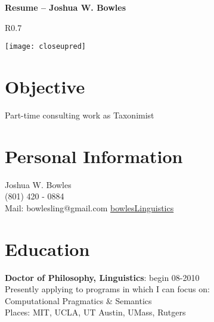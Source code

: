 \documentclass[margin,line,a4paper]{resume}
\begin{document}
{\sc \Large {\bf Resume -- Joshua W. Bowles}}
\begin{resume}
    \vspace{0.5cm}
    \begin{wrapfigure}{R}{0.7\textwidth}
         \vspace{-1cm}
        \begin{center}
        \texttt{[image: closeupred]}
        \end{center}
         \vspace{-1cm}
    \end{wrapfigure}
\section{Objective}
Part-time consulting work as Taxonimist

\section{Personal Information}
Joshua W. Bowles\\
(801) 420 - 0884\\
Mail: bowlesling@gmail.com
\href{http://sites.google.com/site/bowleslinguistics/}{bowlesLinguistics}\\ 
  

\section{Education}
{\bf Doctor of Philosophy, Linguistics}: begin 08-2010\\ 
Presently applying to programs in which I can focus on:\\ Computational Pragmatics \& Semantics\\ Places: MIT, UCLA, UT Austin, UMass, Rutgers  


\end{resume}
\end{document}
